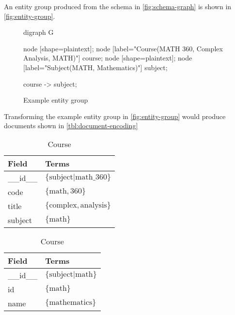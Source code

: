 		\begin{ex}
			An entity group produced from the schema in \vref{fig:schema-graph} is shown in \vref{fig:entity-group}.
			
			\begin{figure}
				\centering
				
				\begin{dot2tex}[dot]
					digraph G {
						node [shape=plaintext]; {node [label="Course(MATH 360, Complex Analysis, MATH)"] course;}
						node [shape=plaintext]; {node [label="Subject(MATH, Mathematics)"] subject;}
						
						course -> subject;
					}
				\end{dot2tex}
				
				\caption{Example entity group}
				\label{fig:entity-group}
			\end{figure}
			
			Transforming the example entity group in \vref{fig:entity-group} would produce documents shown in \vref{tbl:document-encoding}
			
			\begin{table}
				\begin{subtable}[b]{0.33\linewidth}
					\centering
					
					\begin{tabular}{ll}
						\toprule
						Field & Terms \\
						\midrule
						\_\_id\_\_ & \(\{\text{subject|math\_360}\}\) \\
						code & \(\{\text{math}, \text{360}\}\) \\
						title & \(\{\text{complex}, \text{analysis}\}\) \\
						subject & \(\{\text{math}\}\) \\
						\bottomrule
					\end{tabular}
					
					\caption{Course}
				\end{subtable}
				\begin{subtable}[b]{0.33\linewidth}
					\centering
					
					\begin{tabular}{ll}
						\toprule
						Field & Terms \\
						\midrule
						\_\_id\_\_ & \(\{\text{subject|math}\}\) \\
						id & \(\{\text{math}\}\) \\
						name & \(\{\text{mathematics}\}\) \\
						\bottomrule
					\end{tabular}
					

\end{subtable}
\end{table}
\end{ex}
